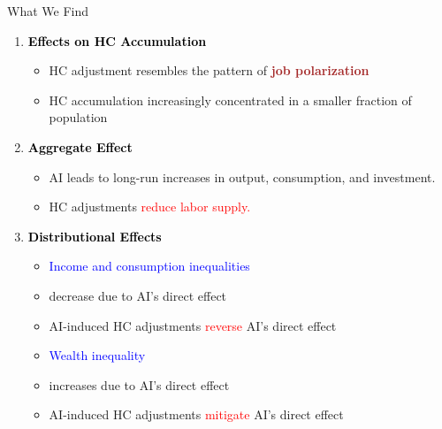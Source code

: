 \documentclass[serif, aspectratio=169]{beamer}
\theoremstyle{remark}
\theoremstyle{plain}
\begin{document}
\begin{frame}{What We Find}

\medskip{}

\begin{enumerate}
\item \textbf{\textcolor{black}{Effects on HC Accumulation}}
\begin{itemize}
\item HC adjustment resembles the pattern of \textbf{\textcolor{brown}{job polarization}}
\item HC accumulation increasingly concentrated in a smaller fraction of population
\end{itemize}
\medskip{}

\item \textbf{\textcolor{black}{Aggregate Effect}}
\begin{itemize}
\item AI leads to long-run increases in output, consumption, and investment. 
\item HC adjustments \textcolor{red}{reduce labor supply. }
\end{itemize}
\medskip{}

\item \textbf{\textcolor{black}{Distributional Effects }}
\begin{itemize}
\item \textcolor{blue}{Income and consumption inequalities}
\item[-] decrease due to AI's direct effect
\item[-] AI-induced HC adjustments \textcolor{red}{reverse} AI's direct effect
\item \textcolor{blue}{Wealth inequality}
\item[-] increases due to AI's direct effect
\item[-] AI-induced HC adjustments \textcolor{red}{mitigate} AI's direct effect
\end{itemize}
\end{enumerate}
\end{frame}
\end{document}
